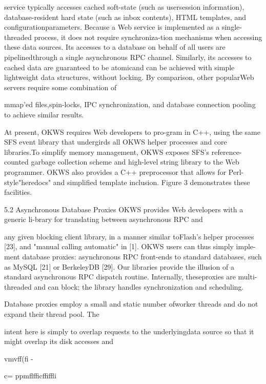 service typically accesses cached soft-state (such as usersession information), database-resident hard state (such
as inbox contents), HTML templates, and configurationparameters. Because a Web service is implemented as a
single-threaded process, it does not require synchroniza-tion mechanisms when accessing these data sources. Its
accesses to a database on behalf of all users are pipelinedthrough a single asynchronous RPC channel. Similarly,
its accesses to cached data are guaranteed to be atomicand can be achieved with simple lightweight data structures, without locking. By comparison, other popularWeb servers require some combination of

mmap'ed files,spin-locks, IPC synchronization, and database connection pooling to achieve similar results.

At present, OKWS requires Web developers to pro-gram in C++, using the same SFS event library that undergirds all OKWS helper processes and core libraries.To simplify memory management, OKWS exposes SFS's
reference-counted garbage collection scheme and high-level string library to the Web programmer. OKWS also
provides a C++ preprocessor that allows for Perl-style"heredocs" and simplified template inclusion. Figure 3
demonstrates these facilities.

5.2 Asynchronous Database Proxies
OKWS provides Web developers with a generic li-brary for translating between asynchronous RPC and

any given blocking client library, in a manner similar toFlash's helper processes [23], and "manual calling automatic" in [1]. OKWS users can thus simply imple-ment database proxies: asynchronous RPC front-ends
to standard databases, such as MySQL [21] or BerkeleyDB [29]. Our libraries provide the illusion of a standard
asynchronous RPC dispatch routine. Internally, theseproxies are multi-threaded and can block; the library handles synchronization and scheduling.

Database proxies employ a small and static number ofworker threads and do not expand their thread pool. The

intent here is simply to overlap requests to the underlyingdata source so that it might overlap its disk accesses and

v\Gamma \Delta \Theta  m\Lambda \Xi \Pi \Sigma v\Upsilon \Xi \Phi \Psi \Psi \Omega \Sigma \Gamma \Upsilon ff\Pi \Pi  (fi
-

\Pi \Phi \Sigma  \Upsilon \Gamma c\Gamma \Sigma  = \Omega p\Sigma pmflffi\Upsilon \Gamma c\Gamma \Sigma ffiffli

